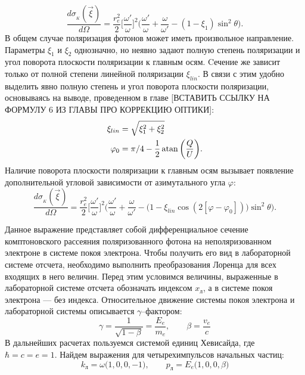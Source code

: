 \documentclass[12pt]{article}
\begin{document}
\begin{equation}
\frac{d \sigma_{_K}(\vec{\xi})}{d\Omega} = \frac{r_e^2}{2} \bigg[\frac{\omega'}{\omega}\bigg]^2 \bigg(\frac{\omega'}{\omega}+\frac{\omega}{\omega'} -(1-\xi_1) \sin^2\theta\bigg). 
\label{eq:compton_xsec_pol1}
\end{equation}
В общем случае поляризация фотонов может иметь произвольное направление. Параметры $\xi_1$ и $\xi_2$ однозначно, но неявно задают полную степень поляризации и угол поворота плоскости поляризации к главным осям. Cечение же зависит только от полной степени линейной поляризации $\xi_{lin}$. В связи с этим удобно выделить явно полную степень и угол поворота плоскости поляризации, основываясь на выводе, проведенном в главе [ВСТАВИТЬ ССЫЛКУ НА ФОРМУЛУ 6 ИЗ ГЛАВЫ ПРО КОРРЕКЦИЮ ОПТИКИ]:
\begin{align}
\xi_{lin} &= \sqrt{\xi_1^2+\xi_2^2}\\
\varphi_0 &= \pi/4 - \frac{1}{2}\atan\bigg(\frac{Q}{U}\bigg).
\end{align}
Наличие поворота плоскости поляризации к главным осям вызывает появление дополнительной угловой зависимости от азимутального угла $\varphi$:
\begin{equation}
\frac{d \sigma_{_K}(\vec{\xi})}{d\Omega} = \frac{r_e^2}{2} \bigg[\frac{\omega'}{\omega}\bigg]^2 \bigg(\frac{\omega'}{\omega}+\frac{\omega}{\omega'} -\big(1-\xi_{lin}\cos(2[\varphi - \varphi_0])\big) \sin^2\theta\bigg). 
\label{eq:compton_xsec_pol2}
\end{equation}
\par Данное выражение представляет собой дифференциальное сечение комптоновского рассеяния поляризованного фотона на неполяризованном электроне в системе покоя электрона. Чтобы получить его вид в лабораторной системе отсчета, необходимо выполнить преобразования Лоренца для всех входящих в него величин. Перед этим условимся величины, выраженные в лабораторной системе отсчета обозначать индексом $x_\text{л}$, а в системе покоя электрона --- без индекса. Относительное движение системы покоя электрона и лабораторной системы описывается $\gamma$--фактором:
\begin{equation}
\gamma = \frac{1}{\sqrt{1-\beta}} = \frac{E_{e}}{m_{e}}, \qquad \beta = \frac{v_{{e}}}{c}
\label{eq:gam_beta_def}
\end{equation}
В дальнейших расчетах пользуемся системой единиц Хевисайда, где $\hbar=c=e=1$. Найдем выражения для четырехимпульсов начальных частиц:
\begin{equation}
k_{\text{л}} = \omega\big(1,0,0,-1\big), \qquad p_{\text{л}} = E_e\big(1,0,0,\beta\big)
\label{eq:initial_state_particles}
\end{equation}
\end{document}

